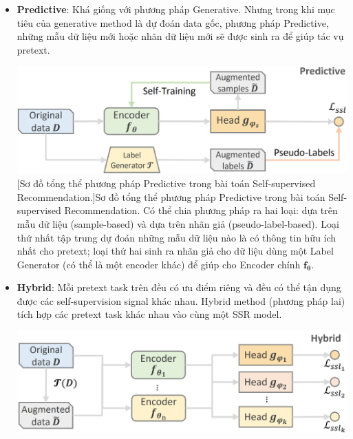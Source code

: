 \begin{itemize}
    \item[] \textbf{Predictive}: Khá giống với phương pháp Generative. Nhưng trong khi mục tiêu của generative method là dự đoán data gốc, phương pháp Predictive, những mẫu dữ liệu mới hoặc nhãn dữ liệu mới sẽ được sinh ra để giúp tác vụ pretext.\\
    \begin{minipage}{\linewidth}
        \vspace*{+5mm}
        \centering
        \includegraphics[scale=0.3]{images/Chapter3/pred_ssr.png}
        [Sơ đồ tổng thể phương pháp Predictive trong bài toán Self-supervised Recommendation.]{Sơ đồ tổng thể phương pháp Predictive trong bài toán Self-supervised Recommendation. Có thể chia phương pháp ra hai loại: dựa trên mẫu dữ liệu (sample-based) và dựa trên nhãn giả (pseudo-label-based). Loại thứ nhất tập trung dự đoán những mẫu dữ liệu nào là có thông tin hữu ích nhất cho pretext; loại thứ hai sinh ra nhãn giả cho dữ liệu dùng một Label Generator (có thể là một encoder khác) để giúp cho Encoder chính $\bm{f_\theta}$.}
    \end{minipage}
    
    \item[] \textbf{Hybrid}: Mỗi pretext task trên đều có ưu điểm riêng và đều có thể tận dụng được các self-supervision signal khác nhau. Hybrid method (phương pháp lai) tích hợp các pretext task khác nhau vào cùng một SSR model.\\
    \begin{minipage}{\linewidth}
        \vspace*{+5mm}
        \centering
        \includegraphics[scale=0.3]{images/Chapter3/hybrid_ssr.png}
    \end{minipage}
\end{itemize}

